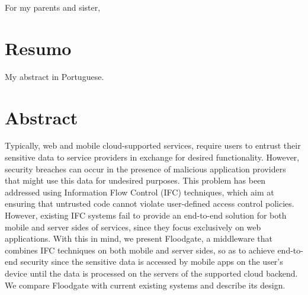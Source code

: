 \vfill
\mbox{}
\vfill\Large
\begin{flushright}
  \begin{minipage}{8cm}
    \begin{center}

For my parents and sister,\\

    \end{center}
  \end{minipage}
\end{flushright}
\normalsize\vfill

\cleardoublepage


\chapter*{Resumo}
\thispagestyle{empty}
 
My abstract in Portuguese.

\newpage


\chapter*{Abstract}
\thispagestyle{empty}

Typically, web and mobile cloud-supported services, require users to entrust their sensitive data to service providers in exchange for desired functionality. However, security breaches can occur in the presence of malicious application providers that might use this data for undesired purposes. This problem has been addressed using Information Flow Control (IFC) techniques, which aim at ensuring that untrusted code cannot violate user-defined access control policies. However, existing IFC systems fail to provide an end-to-end solution for both mobile and server sides of services, since they focus exclusively on web applications. With this in mind, we present Floodgate, a middleware that combines IFC techniques on both mobile and server sides, so as to achieve end-to-end security since the sensitive data is accessed by mobile apps on the user's device until the data is processed on the servers of the supported cloud backend. We compare Floodgate with current existing systems and describe its design.

